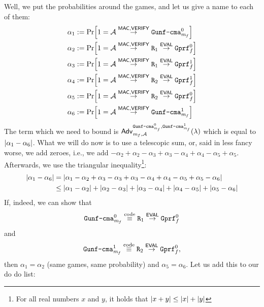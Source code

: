 \documentclass[a4paper,table,dvipsnames]{article}
\theoremstyle{definition}
\newcommand{\M}[1]{\ensuremath{\text{\texttt{#1}}}}
\renewcommand{\O}[1]{\ensuremath{\mathsf{#1}}}
\newcommand{\pcvar}[1]{\ensuremath{\mathit{#1}}}
\newcommand{\m}{\pcvar{m}} %
\begin{document}
Well, we put the probabilities around the games, and let us give a name to each of them:
\begin{align*}
   \alpha_1&:=\prob{1=\adv\stackrel{\O{MAC},\O{VERIFY}}{\rightarrow}\M{Gunf\text{-}cma}_{\m_f}^0}\\
   \alpha_2&:=\prob{1=\adv\stackrel{\O{MAC},\O{VERIFY}}{\rightarrow}\M{R}_1\stackrel{\O{EVAL}}{\rightarrow}\M{Gprf}^0_f}\\
   \alpha_3&:=\prob{1=\adv\stackrel{\O{MAC},\O{VERIFY}}{\rightarrow}\M{R}_1\stackrel{\O{EVAL}}{\rightarrow}\M{Gprf}^1_f}\\
   \alpha_4&:=\prob{1=\adv\stackrel{\O{MAC},\O{VERIFY}}{\rightarrow}\M{R}_2\stackrel{\O{EVAL}}{\rightarrow}\M{Gprf}^1_f}\\
   \alpha_5&:=\prob{1=\adv\stackrel{\O{MAC},\O{VERIFY}}{\rightarrow}\M{R}_2\stackrel{\O{EVAL}}{\rightarrow}\M{Gprf}^0_f}\\
   \alpha_6&:=\prob{1=\adv\stackrel{\O{MAC},\O{VERIFY}}{\rightarrow}\M{Gunf\text{-}cma}_{\m_f}^1}\\
\end{align*}
The term which we need to bound is $\mathsf{Adv}^{\M{Gunf\text{-}cma}_{\m_f}^0,\M{Gunf\text{-}cma}_{\m_f}^1}_{\m_f,\adv}(\lambda)$ which is equal to $\left\lvert\alpha_1-\alpha_6\right\rvert$. What we will do now is to use a telescopic sum, or, said in less fancy worse, we add zeroes, i.e., we add $-\alpha_2+\alpha_2-\alpha_3+\alpha_3-\alpha_4+\alpha_4-\alpha_5+\alpha_5$. Afterwards, we use the triangular inequality\footnote{For all real numbers $x$ and $y$, it holds that $\left\lvert x+y\right\rvert\leq\left\lvert x\right\rvert+\left\lvert y\right\rvert$}:
\begin{align*}
\left\lvert\alpha_1-\alpha_6\right\rvert &=|\alpha_1-\alpha_2+\alpha_3-\alpha_3+\alpha_3-\alpha_4+\alpha_4-\alpha_5+\alpha_5-\alpha_6|\\
&\leq\left\lvert\alpha_1-\alpha_2\right\rvert+\left\lvert\alpha_2-\alpha_3\right\rvert+\left\lvert\alpha_3-\alpha_4\right\rvert+\left\lvert\alpha_4-\alpha_5\right\rvert+\left\lvert\alpha_5-\alpha_6\right\rvert
\end{align*}
If, indeed, we can show that 
\[\M{Gunf\text{-}cma}_{\m_f}^0\stackrel{\text{code}}{\equiv}\M{R}_1\stackrel{\O{EVAL}}{\rightarrow}\M{Gprf}^0_f\]
and
\[\M{Gunf\text{-}cma}_{\m_f}^1\stackrel{\text{code}}{\equiv}\M{R}_2\stackrel{\O{EVAL}}{\rightarrow}\M{Gprf}^0_f,\]
then $\alpha_1=\alpha_2$ (same games, same probability) and $\alpha_5=\alpha_6$. Let us add this to our do do list:
\end{document}
